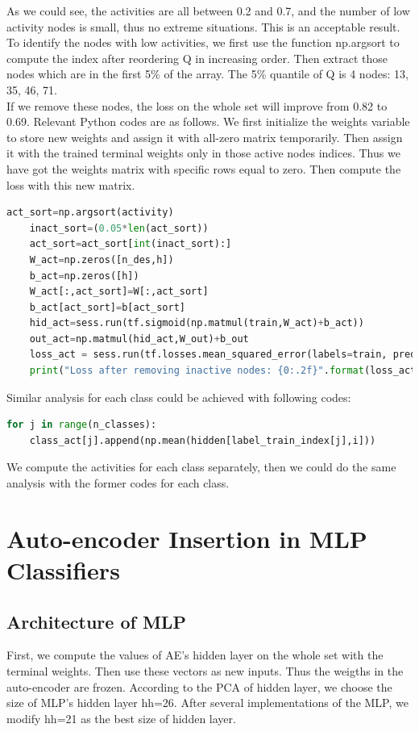 \documentclass{article}
\begin{document}
  As we could see, the activities are all between 0.2 and 0.7, and the number of low activity nodes is small, thus no extreme situations. This is an acceptable result. To identify the nodes with low activities, we first use the function np.argsort to compute the index after reordering Q in increasing order. Then extract those nodes which are in the first 5\% of the array. The 5\% quantile of Q is 4 nodes: 13, 35, 46, 71.\\
  If we remove these nodes, the loss on the whole set will improve from 0.82 to 0.69. Relevant Python codes are as follows. We first initialize the weights variable to store new weights and assign it with all-zero matrix temporarily. Then assign it with the trained terminal weights only in those active nodes indices. Thus we have got the weights matrix with specific rows equal to zero. Then compute the loss with this new matrix.
  \begin{lstlisting}[language=Python]
    act_sort=np.argsort(activity)
    inact_sort=(0.05*len(act_sort))
    act_sort=act_sort[int(inact_sort):]
    W_act=np.zeros([n_des,h])
    b_act=np.zeros([h])
    W_act[:,act_sort]=W[:,act_sort]
    b_act[act_sort]=b[act_sort]
    hid_act=sess.run(tf.sigmoid(np.matmul(train,W_act)+b_act))
    out_act=np.matmul(hid_act,W_out)+b_out
    loss_act = sess.run(tf.losses.mean_squared_error(labels=train, predictions=out_act))
    print("Loss after removing inactive nodes: {0:.2f}".format(loss_act))
  \end{lstlisting}
  Similar analysis for each class could be achieved with following codes:
  \begin{lstlisting}[language=Python]
  for j in range(n_classes):
    class_act[j].append(np.mean(hidden[label_train_index[j],i]))
  \end{lstlisting}
  We compute the activities for each class separately, then we could do the same analysis with the former codes for each class.
  \section{Auto-encoder Insertion in MLP Classifiers}
  \subsection{Architecture of MLP}
  First, we compute the values of AE's hidden layer on the whole set with the terminal weights. Then use these vectors as new inputs. Thus the weigths in the auto-encoder are frozen. According to the PCA of hidden layer, we choose the size of MLP's hidden layer hh=26. After several implementations of the MLP, we modify hh=21 as the best size of hidden layer.
\end{document}
